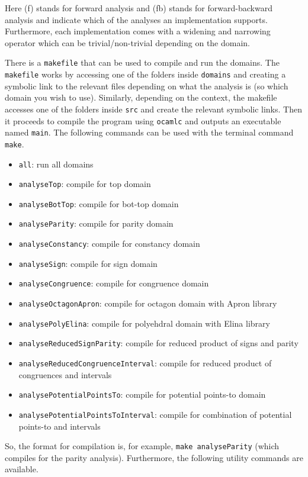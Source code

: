 \documentclass [10pt]{article}
\begin{document}
Here (f) stands for forward analysis and (fb) stands for forward-backward analysis and indicate which of the analyses an implementation supports. Furthermore, each implementation comes with a widening and narrowing operator which can be trivial/non-trivial depending on the domain.\par
There is a \verb|makefile| that can be used to compile and run the domains. The \verb|makefile| works by accessing one of the folders inside \verb|domains| and creating a symbolic link to the relevant files depending on what the analysis is (so which domain you wish to use). Similarly, depending on the context, the makefile accesses one of the folders inside \verb|src| and create the relevant symbolic links. Then it proceeds to compile the program using \verb|ocamlc| and outputs an executable named \verb|main|. The following commands can be used with the terminal command \verb|make|.
\begin{itemize}
  \item \verb|all|: run all domains 
  \item \verb|analyseTop|: compile for top domain
  \item \verb|analyseBotTop|: compile for bot-top domain
  \item \verb|analyseParity|: compile for parity domain
  \item \verb|analyseConstancy|: compile for constancy domain
  \item \verb|analyseSign|: compile for sign domain
  \item \verb|analyseCongruence|: compile for congruence domain
  \item \verb|analyseOctagonApron|: compile for octagon domain with Apron library
  \item \verb|analysePolyElina|: compile for polyehdral domain with Elina library
  \item \verb|analyseReducedSignParity|: compile for reduced product of signs and parity
  \item \verb|analyseReducedCongruenceInterval|: compile for reduced product of congruences and intervals
  \item \verb|analysePotentialPointsTo|: compile for potential points-to domain
  \item \verb|analysePotentialPointsToInterval|: compile for combination of potential points-to and intervals
\end{itemize}
So, the format for compilation is, for example, \verb|make analyseParity| (which compiles for the parity analysis). Furthermore, the following utility commands are available.
\end{document}
